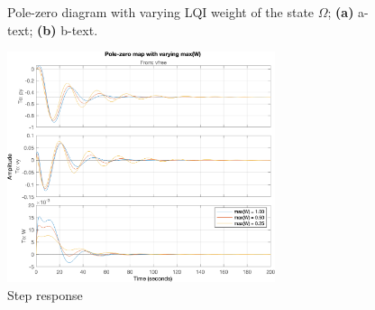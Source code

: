 \begin{figure}[ht]
	\centering
	
	\hfil
	
	\caption{Pole-zero diagram with varying LQI weight of the state $ \Omega $; \textbf{(a)} a-text; \textbf{(b)} b-text.}
	\label{fig:pzmap_W_both}
\end{figure}

\begin{figure}[ht]
	\centering
	\includegraphics[width=0.7\textwidth]{Graphics/LQI pole zero/103_step_W.png}
	\caption{Step response}
	\label{fig:step_W}
\end{figure}

